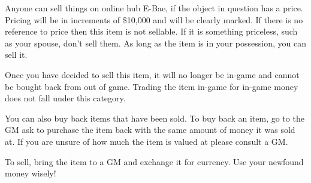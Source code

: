 \documentclass[green]{LRSguildcamp1}
\begin{document}
\name{\gSellingThing{}}
 
Anyone can sell things on online hub E-Bae, if the object in question has a price. Pricing will be in increments of \$10,000 and will be clearly marked. If there is no reference to price then this item is not sellable. If it is something priceless, such as your spouse, don't sell them.  As long as the item is in your possession, you can sell it. 

Once you have decided to sell this item, it will no longer be in-game and cannot be bought back from out of game. Trading the item in-game for in-game money does not fall under this category.  

You can also buy back items that have been sold. To buy back an item, go to the GM ask to purchase the item back with the same amount of money it was sold at. If you are unsure of how much the item is valued at please consult a GM. 

To sell, bring the item to a GM and exchange it for currency. Use your newfound money wisely! 
\end{document}
